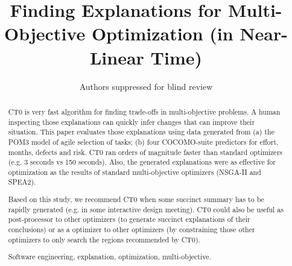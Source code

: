 \documentclass[runningheads]{llncs}
\newcommand{\keywords}[1]{\par\addvspace\baselineskip
\noindent\keywordname\enspace\ignorespaces#1}
\begin{document}
\mainmatter  %

\title{Finding Explanations for Multi-Objective Optimization
(in Near-Linear Time)}


%
%
\author{Authors suppressed for blind review}

%


%
%
 
\maketitle


\begin{abstract}
CT0 is very fast  algorithm for finding trade-offs in multi-objective problems.
A human inspecting those explanations 
can quickly infer changes
that can improve their situation. 
This paper evaluates those explanations using data
generated from   (a) the POM3 model of agile selection
of tasks; (b) four COCOMO-suite predictors for effort, months, defects and risk.
CT0 ran orders of magnitude faster than standard
optimizers  (e.g. 3 seconds vs 150 seconds).
Also, the  generated 
explanations were as effective for optimization
as the results of standard multi-objective
optimizers (NSGA-II and SPEA2). 

Based on this study, we recommend CT0 
when some succinct summary has to be rapidly generated (e.g.  in some interactive
design meeting). CT0 could also be useful as post-processor
to other optimizers (to generate succinct explanations of their
conclusions) or as a
optimizer to other optimizers (by constraining those other optimizers
to only search the regions recommended by CT0).

\keywords{Software engineering, explanation, optimization, multi-objective.}
\end{abstract}
\end{document}
